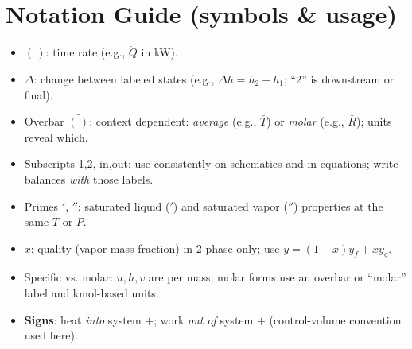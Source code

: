 \documentclass[10pt]{article}
\begin{document}
\section{Notation Guide (symbols \& usage)}
\begin{multicols}{2}

\begin{itemize}
    \item $\dot{(\,)}$: time rate (e.g., $\dot Q$ in kW).
    \item $\Delta$: change between labeled states (e.g., $\Delta h=h_2-h_1$; “2” is downstream or final).
    \item Overbar $\bar{(\,)}$: context dependent: \emph{average} (e.g., $\bar{T}$) or \emph{molar} (e.g., $\bar R$); units reveal which.
    \item Subscripts 1,2, in,out: use consistently on schematics and in equations; write balances \emph{with} those labels.
    \item Primes ${}'$, ${}''$: saturated liquid ($'$) and saturated vapor ($''$) properties at the same $T$ or $P$.
    \item $x$: quality (vapor mass fraction) in 2-phase only; use $y=(1-x)y_f+xy_g$.
    \item Specific vs. molar: $u,h,v$ are per mass; molar forms use an overbar or “molar” label and kmol-based units.
    \item \textbf{Signs}: heat \emph{into} system $+$; work \emph{out of} system $+$ (control-volume convention used here).
\end{itemize}

\end{multicols}
\end{document}
